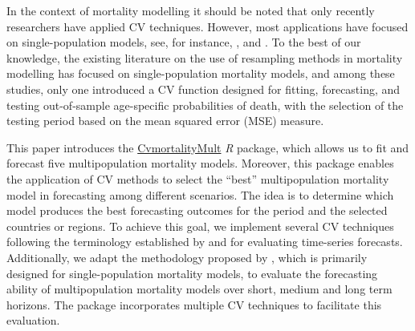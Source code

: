 In the context of mortality modelling it should be noted that only recently researchers have applied CV techniques. However, most applications have focused on single-population models, see, for instance, \citet{Villegas2017, Hyndman2019, Atance2020, Kessy2022, Sridaran2022, Lindholm2022}, and \citet{Barigou2023}. To the best of our knowledge, the existing literature on the use of resampling methods in mortality modelling has focused on single-population mortality models, and among these studies, only one \citet{Sridaran2022} introduced a CV function designed for fitting, forecasting, and testing out-of-sample age-specific probabilities of death, with the selection of the testing period based on the mean squared error (MSE) measure.

This paper introduces the \href{https://cran.r-project.org/web/packages/CvmortalityMult/index.html}{CvmortalityMult} \emph{R} package, which allows us to fit and forecast five multipopulation mortality models. Moreover, this package enables the application of CV methods to select the ``best'' multipopulation mortality model in forecasting among different scenarios. The idea is to determine which model produces the best forecasting outcomes for the period and the selected countries or regions. To achieve this goal, we implement several CV techniques following the terminology established by \citet{Tashman2000} and \citet{Berg2012} for evaluating time-series forecasts. Additionally, we adapt the methodology proposed by \citet{Atance2020}, which is primarily designed for single-population mortality models, to evaluate the forecasting ability of multipopulation mortality models over short, medium and long term horizons. The package incorporates multiple CV techniques to facilitate this evaluation.

